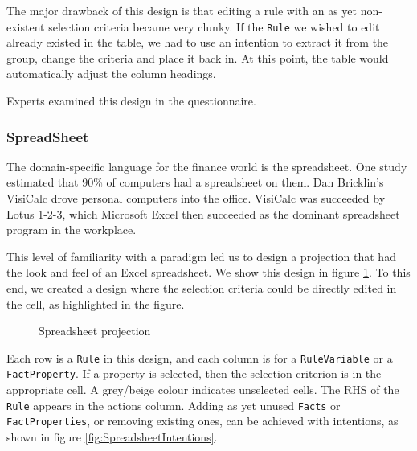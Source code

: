 The major drawback of this design is that editing a rule with an as yet non-existent selection criteria became very clunky.
If the \texttt{Rule} we wished to edit already existed in the table, we had to use an intention to extract it from the group, change the criteria and place it back in.
At this point, the table would automatically adjust the column headings.

Experts examined this design in the questionnaire.

\subsubsection{SpreadSheet}

The domain-specific language for the finance world is the spreadsheet.
One study estimated that 90\% of computers had a spreadsheet on them\cite{bradley2009using}.
Dan Bricklin's VisiCalc drove personal computers into the office.
VisiCalc was succeeded by Lotus 1-2-3, which Microsoft Excel then succeeded as the dominant spreadsheet program in the workplace.

This level of familiarity with a paradigm led us to design a projection that had the look and feel of an Excel spreadsheet.
We show this design in figure \ref{fig:SpreadsheetProjection}.
To this end, we created a design where the selection criteria could be directly edited in the cell, as highlighted in the figure.

\begin{figure}
    \centering
    \caption{Spreadsheet projection}
    \label{fig:SpreadsheetProjection}
\end{figure}


Each row is a \texttt{Rule} in this design, and each column is for a \texttt{RuleVariable} or a \texttt{FactProperty}.
If a property is selected, then the selection criterion is in the appropriate cell.
A grey/beige colour indicates unselected cells.
The RHS of the \texttt{Rule} appears in the actions column.
Adding as yet unused \texttt{Facts} or \texttt{FactProperties}, or removing existing ones, can be achieved with intentions, as shown in figure \ref{fig:SpreadsheetIntentions}.


